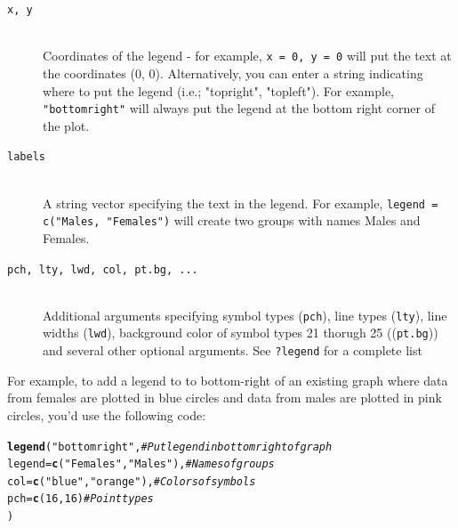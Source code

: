 \documentclass{tufte-book}\usepackage[]{graphicx}\usepackage[]{color}
\makeatletter
\newcommand{\hlnum}[1]{\textcolor[rgb]{0.686,0.059,0.569}{#1}}%
\newcommand{\hlstr}[1]{\textcolor[rgb]{0.192,0.494,0.8}{#1}}%
\newcommand{\hlcom}[1]{\textcolor[rgb]{0.678,0.584,0.686}{\textit{#1}}}%
\newcommand{\hlstd}[1]{\textcolor[rgb]{0.345,0.345,0.345}{#1}}%
\newcommand{\hlkwc}[1]{\textcolor[rgb]{0.333,0.667,0.333}{#1}}%
\newcommand{\hlkwd}[1]{\textcolor[rgb]{0.737,0.353,0.396}{\textbf{#1}}}%
\newenvironment{kframe}{%
 \def\at@end@of@kframe{}%
 \ifinner\ifhmode%
  \def\at@end@of@kframe{\end{minipage}}%
  \begin{minipage}{\columnwidth}%
 \fi\fi%
 \def\FrameCommand##1{\hskip\@totalleftmargin \hskip-\fboxsep
 \colorbox{shadecolor}{##1}\hskip-\fboxsep
     \hskip-\linewidth \hskip-\@totalleftmargin \hskip\columnwidth}%
 \MakeFramed {\advance\hsize-\width
   \@totalleftmargin\z@ \linewidth\hsize
   \@setminipage}}%
 {\par\unskip\endMakeFramed%
 \at@end@of@kframe}
\newenvironment{knitrout}{}{} %
\makeatother
\begin{document}
\begin{footnotesize}
{{\hline

\begin{description}

\item[\tt{x, y}] \hfill \\
Coordinates of the legend - for example, \texttt{x = 0, y = 0} will put the text at the coordinates (0, 0). Alternatively, you can enter a string indicating where to put the legend (i.e.; "topright", "topleft"). For example, \texttt{"bottomright"} will always put the legend at the bottom right corner of the plot.

\item[\tt{labels}] \hfill \\
  A string vector specifying the text in the legend. For example, \texttt{legend = c("Males, "Females")} will create two groups with names Males and Females.
  
\item[\tt{pch, lty, lwd, col, pt.bg, ...}] \hfill \\
Additional arguments specifying symbol types (\texttt{pch}), line types (\texttt{lty}), line widths (\texttt{lwd}), background color of symbol types 21 thorugh 25 ((\texttt{pt.bg})) and several other optional arguments. See \texttt{?legend} for a complete list


\end{description}

}
}
\vspace{5mm} %


For example, to add a legend to to bottom-right of an existing graph where data from females are plotted in blue circles and data from males are plotted in pink circles, you'd use the following code:

\begin{knitrout}
\color{fgcolor}\begin{kframe}
\begin{alltt}
\hlkwd{legend}\hlstd{(}\hlstr{"bottomright"}\hlstd{,} \hlcom{# Put legend in bottom right of graph}
       \hlkwc{legend} \hlstd{=} \hlkwd{c}\hlstd{(}\hlstr{"Females"}\hlstd{,} \hlstr{"Males"}\hlstd{),} \hlcom{# Names of groups}
       \hlkwc{col} \hlstd{=} \hlkwd{c}\hlstd{(}\hlstr{"blue"}\hlstd{,} \hlstr{"orange"}\hlstd{),} \hlcom{# Colors of symbols}
       \hlkwc{pch} \hlstd{=} \hlkwd{c}\hlstd{(}\hlnum{16}\hlstd{,} \hlnum{16}\hlstd{)} \hlcom{# Point types}
       \hlstd{)}
\end{alltt}
\end{kframe}
\end{knitrout}


\end{footnotesize}
\end{document}

